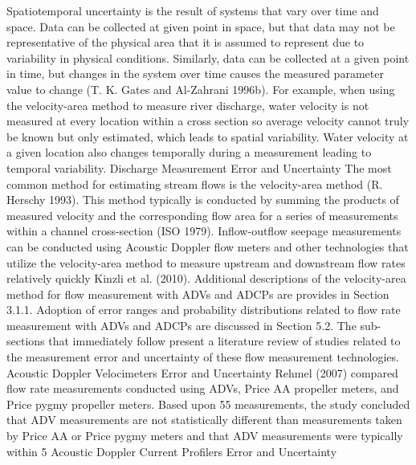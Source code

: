 \begin{linenumbers}
Spatiotemporal uncertainty is the result of systems that vary over time and space.  Data can be collected at given point in space, but that data may not be representative of the physical area that it is assumed to represent due to variability in physical conditions.  Similarly, data can be collected at a given point in time, but changes in the system over time causes the measured parameter value to change (T. K. Gates and Al-Zahrani 1996b).  For example, when using the velocity-area method to measure river discharge, water velocity is not measured at every location within a cross section so average velocity cannot truly be known but only estimated, which leads to spatial variability.  Water velocity at a given location also changes temporally during a measurement leading to temporal variability.
Discharge Measurement Error and Uncertainty
The most common method for estimating stream flows is the velocity-area method (R. Herschy 1993).  This method typically is conducted by summing the products of measured velocity and the corresponding flow area for a series of measurements within a channel cross-section (ISO 1979).  Inflow-outflow seepage measurements can be conducted using Acoustic Doppler flow meters and other technologies that utilize the velocity-area method to measure upstream and downstream flow rates relatively quickly Kinzli et al. (2010).  Additional descriptions of the velocity-area method for flow measurement with ADVs and ADCPs are provides in Section 3.1.1.  Adoption of error ranges and probability distributions related to flow rate measurement with ADVs and ADCPs are discussed in Section 5.2.  The sub-sections that immediately follow present a literature review of studies related to the measurement error and uncertainty of these flow measurement technologies.  
Acoustic Doppler Velocimeters Error and Uncertainty
Rehmel (2007) compared flow rate measurements conducted using ADVs, Price AA propeller meters, and Price pygmy propeller meters.  Based upon 55 measurements, the study concluded that ADV measurements are not statistically different than measurements taken by Price AA or Price pygmy meters and that ADV measurements were typically within 5%
Acoustic Doppler Current Profilers Error and Uncertainty

\end{linenumbers}

